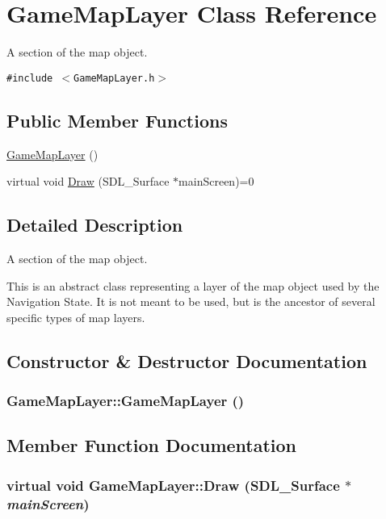 \hypertarget{class_game_map_layer}{
\section{GameMapLayer Class Reference}
\label{d2/d95/class_game_map_layer}
}
A section of the map object.  


{\tt \#include $<$GameMapLayer.h$>$}

\subsection*{Public Member Functions}
\begin{CompactItemize}
\item 
\hyperlink{class_game_map_layer_92a1d055fbbf7f7c2d974038596b857e}{GameMapLayer} ()
\item 
virtual void \hyperlink{class_game_map_layer_d82f8be1c403ce3e55d5ed9177aad68c}{Draw} (SDL\_\-Surface $\ast$mainScreen)=0
\end{CompactItemize}


\subsection{Detailed Description}
A section of the map object. 

This is an abstract class representing a layer of the map object used by the Navigation State. It is not meant to be used, but is the ancestor of several specific types of map layers. 

\subsection{Constructor \& Destructor Documentation}
\hypertarget{class_game_map_layer_92a1d055fbbf7f7c2d974038596b857e}{
\subsubsection[{GameMapLayer}]{\setlength{\rightskip}{0pt plus 5cm}GameMapLayer::GameMapLayer ()}}
\label{d2/d95/class_game_map_layer_92a1d055fbbf7f7c2d974038596b857e}




\subsection{Member Function Documentation}
\hypertarget{class_game_map_layer_d82f8be1c403ce3e55d5ed9177aad68c}{
\subsubsection[{Draw}]{\setlength{\rightskip}{0pt plus 5cm}virtual void GameMapLayer::Draw (SDL\_\-Surface $\ast$ {\em mainScreen})}}
\label{d2/d95/class_game_map_layer_d82f8be1c403ce3e55d5ed9177aad68c}


